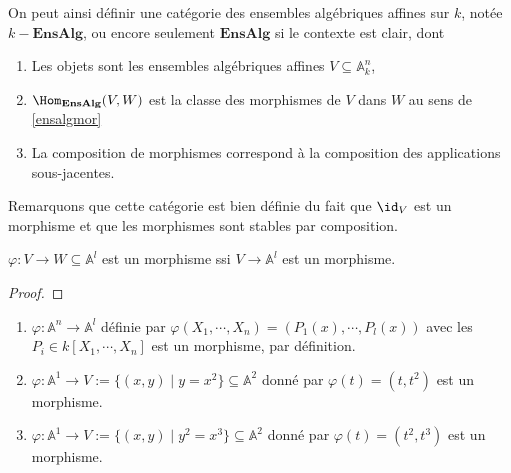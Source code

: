         On peut ainsi définir une catégorie des ensembles algébriques affines sur $k$, notée $k-\mathbf{EnsAlg}$, ou encore seulement $\mathbf{EnsAlg}$ si le contexte est clair, dont
        \begin{enumerate}
            \item Les objets sont les ensembles algébriques affines $V \subseteq \mathbb{A}_k^n$,
            \item $\Hom_\mathbf{EnsAlg}(V,W)$ est la classe des morphismes de $V$ dans $W$ au sens de \ref{ensalgmor}
            \item La composition de morphismes correspond à la composition des applications sous-jacentes.
        \end{enumerate}
        Remarquons que cette catégorie est bien définie du fait que $\id_V$ est un morphisme et que les morphismes sont stables par composition.
        \begin{prop}
            $\varphi : V \to W \subseteq \mathbb{A}^l$ est un morphisme ssi $V \to \mathbb{A}^l$ est un morphisme.
        \end{prop}
        \begin{proof}
        \end{proof}
        \begin{expl}
            \label{ex121}
            \begin{enumerate}
                \item $\varphi : \mathbb{A}^n \to \mathbb{A}^l$ définie par $\varphi(X_1, \cdots, X_n) = (P_1(x), \cdots, P_l(x))$ avec les $P_i \in k[X_1, \cdots, X_n]$ est un morphisme, par définition.
                \item \label{ex3} $\varphi : \mathbb{A}^1 \to V := \{(x,y) \mid y = x^2\} \subseteq \mathbb{A}^2$ donné par $\varphi(t) = (t, t^2)$ est un morphisme.
                \item \label{ex4}$\varphi : \mathbb{A}^1 \to V := \{(x,y) \mid y^2 = x^3\} \subseteq \mathbb{A}^2$ donné par $\varphi(t) = (t^2, t^3)$ est un morphisme.
            \end{enumerate}
        \end{expl}

